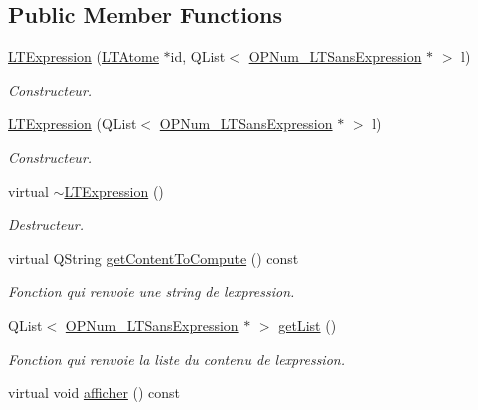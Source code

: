 \subsection*{Public Member Functions}
\begin{DoxyCompactItemize}
\item 
\hyperlink{class_l_t_expression_a61fdf50726f54c3ecdea78150859aab3}{L\+T\+Expression} (\hyperlink{class_l_t_atome}{L\+T\+Atome} $\ast$id, Q\+List$<$ \hyperlink{class_o_p_num___l_t_sans_expression}{O\+P\+Num\+\_\+\+L\+T\+Sans\+Expression} $\ast$ $>$ l)
\begin{DoxyCompactList}\small\item\em Constructeur. \end{DoxyCompactList}\item 
\hyperlink{class_l_t_expression_a92e9b49739f4d707544ed6f816409189}{L\+T\+Expression} (Q\+List$<$ \hyperlink{class_o_p_num___l_t_sans_expression}{O\+P\+Num\+\_\+\+L\+T\+Sans\+Expression} $\ast$ $>$ l)
\begin{DoxyCompactList}\small\item\em Constructeur. \end{DoxyCompactList}\item 
virtual \hyperlink{class_l_t_expression_aa8530b38f8f14319e9b0c2d90f75511d}{$\sim$\+L\+T\+Expression} ()\hypertarget{class_l_t_expression_aa8530b38f8f14319e9b0c2d90f75511d}{}\label{class_l_t_expression_aa8530b38f8f14319e9b0c2d90f75511d}

\begin{DoxyCompactList}\small\item\em Destructeur. \end{DoxyCompactList}\item 
virtual Q\+String \hyperlink{class_l_t_expression_acb3e72d9d7c2beaa2e1349eb1f9bec18}{get\+Content\+To\+Compute} () const 
\begin{DoxyCompactList}\small\item\em Fonction qui renvoie une string de l\textquotesingle{}expression. \end{DoxyCompactList}\item 
Q\+List$<$ \hyperlink{class_o_p_num___l_t_sans_expression}{O\+P\+Num\+\_\+\+L\+T\+Sans\+Expression} $\ast$ $>$ \hyperlink{class_l_t_expression_ad42d9dc5ab8990110e9e9b956401d1b9}{get\+List} ()
\begin{DoxyCompactList}\small\item\em Fonction qui renvoie la liste du contenu de l\textquotesingle{}expression. \end{DoxyCompactList}\item 
virtual void \hyperlink{class_l_t_expression_a5d222890ba90f2e0a3674f5c2f32b94b}{afficher} () const \hypertarget{class_l_t_expression_a5d222890ba90f2e0a3674f5c2f32b94b}{}\label{class_l_t_expression_a5d222890ba90f2e0a3674f5c2f32b94b}


\end{DoxyCompactItemize}
